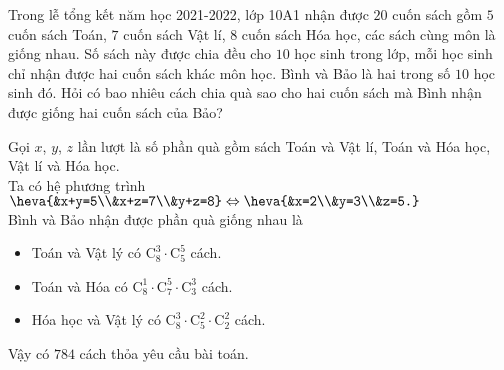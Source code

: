 
\begin{ex}%
	Trong lễ tổng kết năm học 2021-2022, lớp 10A1 nhận được $20$ cuốn sách gồm $5$ cuốn sách Toán, $7$ cuốn sách Vật lí, $8$ cuốn sách Hóa học, các sách cùng môn là giống nhau. Số sách này được chia đều cho $10$ học sinh trong lớp, mỗi học sinh chỉ nhận được hai cuốn sách khác môn học. Bình và Bảo là hai trong số $10$ học sinh đó. Hỏi có bao nhiêu cách chia quà sao cho hai cuốn sách mà Bình nhận được giống hai cuốn sách của Bảo?
	\loigiai
	{
	
	Gọi $x$, $y$, $z$ lần lượt là số phần quà gồm sách Toán và Vật lí, Toán và Hóa học, Vật lí và Hóa học.\\
	Ta có hệ phương trình $\heva{&x+y=5\\&x+z=7\\&y+z=8}\Leftrightarrow \heva{&x=2\\&y=3\\&z=5.}$\\
	Bình và Bảo nhận được phần quà giống nhau là
	\begin{itemize}
		\item Toán và Vật lý có $\mathrm{C}_8^3\cdot \mathrm{C}_5^5$ cách.
		\item Toán và Hóa có $\mathrm{C}_8^1\cdot \mathrm{C}_7^5\cdot \mathrm{C}_3^3$ cách.
		\item Hóa học và Vật lý có $\mathrm{C}_8^3\cdot \mathrm{C}_5^2\cdot \mathrm{C}_2^2$ cách.
	\end{itemize}
	Vậy có $784$ cách thỏa yêu cầu bài toán.
	}
\end{ex}

